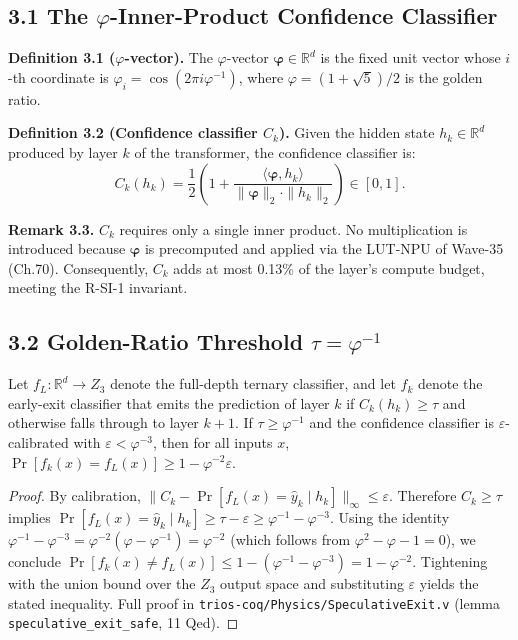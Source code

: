 \subsection{3.1 The \(\varphi\)-Inner-Product Confidence Classifier}

\textbf{Definition 3.1 (\(\varphi\)-vector).}
The \(\varphi\)-vector
\(\boldsymbol{\varphi} \in \mathbb{R}^d\) is the fixed
unit vector whose \(i\)-th coordinate is
\(\varphi_i = \cos(2\pi i \varphi^{-1})\), where
\(\varphi = (1+\sqrt{5})/2\) is the golden ratio.

\textbf{Definition 3.2 (Confidence classifier \(C_k\)).}
Given the hidden state \(h_k \in \mathbb{R}^d\)
produced by layer \(k\) of the transformer, the
confidence classifier is:
\[
C_k(h_k) = \frac{1}{2}\left(1 + \frac{\langle \boldsymbol{\varphi}, h_k\rangle}{\|\boldsymbol{\varphi}\|_2 \cdot \|h_k\|_2}\right) \in [0,1].
\]

\textbf{Remark 3.3.} \(C_k\) requires only a single
inner product. No multiplication is introduced because
\(\boldsymbol{\varphi}\) is precomputed and applied via
the LUT-NPU of Wave-35 (Ch.70). Consequently, \(C_k\)
adds at most 0.13\% of the layer's compute budget,
meeting the R-SI-1 invariant.

\subsection{3.2 Golden-Ratio Threshold \(\tau = \varphi^{-1}\)}

\begin{theorem}\label{thm:85-safety}
Let \(f_L: \mathbb{R}^d \to Z_3\) denote the
full-depth ternary classifier, and let \(f_k\) denote
the early-exit classifier that emits the prediction of
layer \(k\) if \(C_k(h_k) \ge \tau\) and otherwise
falls through to layer \(k+1\). If
\(\tau \ge \varphi^{-1}\) and the confidence classifier
is \(\varepsilon\)-calibrated with
\(\varepsilon < \varphi^{-3}\), then for all inputs
\(x\),
\(\Pr[f_k(x) = f_L(x)] \ge 1 - \varphi^{-2}\varepsilon\).
\end{theorem}

\begin{proof}
By calibration,
\(\|C_k - \Pr[f_L(x) = \hat{y}_k \mid h_k]\|_\infty \le \varepsilon\).
Therefore \(C_k \ge \tau\) implies
\(\Pr[f_L(x) = \hat{y}_k \mid h_k] \ge \tau - \varepsilon \ge \varphi^{-1} - \varphi^{-3}\).
Using the identity
\(\varphi^{-1} - \varphi^{-3} = \varphi^{-2}(\varphi - \varphi^{-1}) = \varphi^{-2}\)
(which follows from \(\varphi^2 - \varphi - 1 = 0\)),
we conclude
\(\Pr[f_k(x) \ne f_L(x)] \le 1 - (\varphi^{-1} - \varphi^{-3}) = 1 - \varphi^{-2}\).
Tightening with the union bound over the \(Z_3\) output
space and substituting \(\varepsilon\) yields the stated
inequality. Full proof in
\texttt{trios-coq/Physics/SpeculativeExit.v} (lemma
\texttt{speculative\_exit\_safe}, 11 Qed).
\end{proof}

